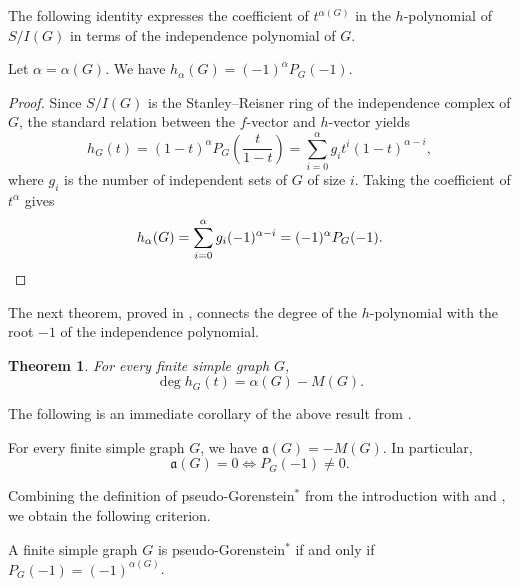 \documentclass[12pt]{amsart}
\theoremstyle{plain}
\newtheorem{thm}{Theorem}[section]
\theoremstyle{definition}
\begin{document}
The following identity expresses the coefficient of $t^{\alpha(G)}$ in the \(h\)-polynomial of \(S/I(G)\) in terms of the
independence polynomial of \(G\).

\begin{prop}\label{prop:h-from-independence}
Let \(\alpha=\alpha(G)\). We have
\(h_{\alpha}(G)=(-1)^{\alpha}P_G(-1)\).
\end{prop}

\begin{proof}
Since \(S/I(G)\) is the Stanley--Reisner ring of the independence complex of \(G\),
the standard relation between the \(f\)-vector and \(h\)-vector yields
\[
h_G(t)=(1-t)^{\alpha}P_G\!\left(\frac{t}{1-t}\right)=\sum_{i=0}^{\alpha} g_i t^i(1-t)^{\alpha-i},
\]
where \(g_i\) is the number of independent sets of \(G\) of size \(i\).  Taking the coefficient of \(t^\alpha\)
gives
\[
h_{\alpha}(G)=\sum_{i=0}^{\alpha} g_i(-1)^{\alpha-i}
=(-1)^{\alpha}P_G(-1). \qedhere
\]
\end{proof}
The next theorem, proved in \cite[Theorem 4.4]{biermann2026}, connects the degree of
the \(h\)-polynomial with the root \(-1\) of the independence polynomial.
\begin{thm}\cite[Theorem 4.4]{biermann2026}\label{thm:deg-via-ord}
For every finite simple graph \(G\),
\[
\deg h_G(t)=\alpha(G)-M(G).
\]
\end{thm}

The following is an immediate corollary of the above result from \cite{biermann2026}.


\begin{cor}\label{cor:a-via-M}
For every finite simple graph \(G\), we have \(\mathfrak a(G)=-M(G)\). In particular,
\[
\mathfrak a(G)=0 \iff P_G(-1)\neq 0.
\]
\end{cor}



Combining the definition of pseudo-Gorenstein\(^{*}\) from the introduction with
 and , we obtain the following
criterion.

\begin{cor}\label{cor:PGstar-criterion}
A finite simple graph \(G\) is pseudo-Gorenstein\(^{*}\) if and only if \(P_G(-1)=(-1)^{\alpha(G)}\).
\end{cor}
\end{document}
